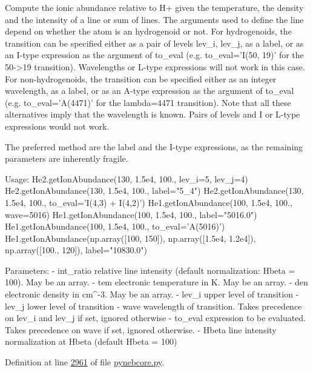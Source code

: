 \begin{DoxyVerb}Compute the ionic abundance relative to H+ given the temperature, the density and the 
    intensity of a line or sum of lines.
The arguments used to define the line depend on whether the atom is an hydrogenoid or not. 
For hydrogenoids, the transition can be specified either as a pair of levels 
    lev_i, lev_j, as a label, or as an I-type expression as the argument of to_eval 
    (e.g. to_eval='I(50, 19)' for the 50->19 transition). Wavelengths or L-type expressions 
    will not work in this case. 
For non-hydrogenoids, the transition can be specified either as an integer wavelength, 
    as a label, or as an A-type expression as the argument of to_eval (e.g. to_eval='A(4471)' 
    for the lambda=4471 transition). Note that all these alternatives imply that the wavelength
    is known. Pairs of levels and I or L-type expressions would not work.

The preferred method are the label and the I-type expressions, as the remaining parameters 
    are inherently fragile.

Usage:
    He2.getIonAbundance(130, 1.5e4, 100., lev_i=5, lev_j=4)
    He2.getIonAbundance(130, 1.5e4, 100., label="5_4")
    He2.getIonAbundance(130, 1.5e4, 100., to_eval='I(4,3) + I(4,2)')
    He1.getIonAbundance(100, 1.5e4, 100., wave=5016)
    He1.getIonAbundance(100, 1.5e4, 100., label="5016.0")
    He1.getIonAbundance(100, 1.5e4, 100., to_eval='A(5016)')
    He1.getIonAbundance(np.array([100, 150]), np.array([1.5e4, 1.2e4]), np.array([100., 120]), 
label="10830.0")
    
Parameters:
    - int_ratio    relative line intensity (default normalization: Hbeta = 100). 
            May be an array.
    - tem          electronic temperature in K. May be an array.
    - den          electronic density in cm^-3. May be an array.
    - lev_i        upper level of transition
    - lev_j        lower level of transition
    - wave         wavelength of transition. Takes precedence on lev_i and lev_j if set, 
            ignored otherwise 
    - to_eval      expression to be evaluated. Takes precedence on wave if set, 
            ignored otherwise.
    - Hbeta        line intensity normalization at Hbeta (default Hbeta = 100)\end{DoxyVerb}
 

Definition at line \hyperlink{pynebcore_8py_source_l02961}{2961} of file \hyperlink{pynebcore_8py_source}{pynebcore.\+py}.



